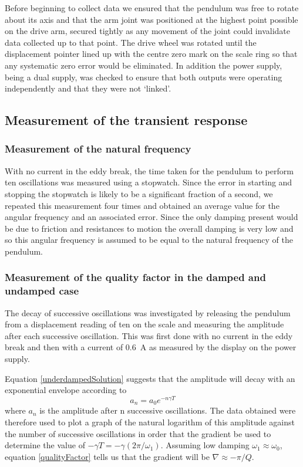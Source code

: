 \documentclass[12pt]{article}
\begin{document}
Before beginning to collect data we ensured that the pendulum was free to rotate about its axis and that the arm joint was positioned at the highest point possible on the drive arm, secured tightly as any movement of the joint could invalidate data collected up to that point. The drive wheel was rotated until the displacement pointer lined up with the centre zero mark on the scale ring so that any systematic zero error would be eliminated. In addition the power supply, being a dual supply, was checked to ensure that both outputs were operating independently and that they were not `linked'.

\subsection{Measurement of the transient response}
\subsubsection{Measurement of the natural frequency}
With no current in the eddy break, the time taken for the pendulum to perform ten oscillations was measured using a stopwatch. Since the error in starting and stopping the stopwatch is likely to be a significant fraction of a second, we repeated this measurement four times and obtained an average value for the angular frequency and an associated error. Since the only damping present would be due to friction and resistances to motion the overall damping is very low and so this angular frequency is assumed to be equal to the natural frequency of the pendulum.

\subsubsection{Measurement of the quality factor in the damped and undamped case}
The decay of successive oscillations was investigated by releasing the pendulum from a displacement reading of ten on the scale and measuring the amplitude after each successive oscillation. This was first done with no current in the eddy break and then with a current of \SI{0.6}{\ampere} as measured by the display on the power supply.

Equation \ref{underdampedSolution} suggests that the amplitude will decay with an exponential envelope according to
\begin{equation}
a_n=a_0e^{-n\gamma T}
\label{exponentialEnvelope}
\end{equation}
where $a_n$ is the amplitude after n successive oscillations. The data obtained were therefore used to plot a graph of the natural logarithm of this amplitude against the number of successive oscillations in order that the gradient be used to determine the value of $-\gamma T=-\gamma(2\pi/\omega_1)$. Assuming low damping $\omega_1\approx\omega_0$, equation \ref{qualityFactor} tells us that the gradient will be $\nabla\approx-\pi/Q$.
\end{document}
